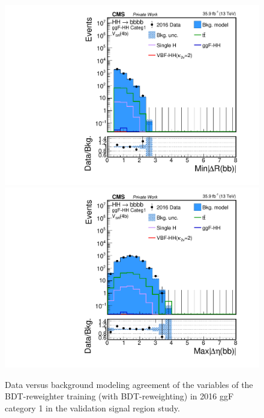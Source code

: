 \begin{figure}[htbp!]
\begin{center}
\includegraphics[width=0.24\linewidth]{Figures/Modeling/background/plotsDatadrivenWithBDT/2016/GGFcateg1_SR_210/Histogram/plot2016_min_4b_deltaR_Btag4_GGFcateg1_SR_210_Histogram_log.pdf}
\includegraphics[width=0.24\linewidth]{Figures/Modeling/background/plotsDatadrivenWithBDT/2016/GGFcateg1_SR_210/Histogram/plot2016_max_4b_deltaEta_Btag4_GGFcateg1_SR_210_Histogram_log.pdf}
\end{center}
\caption{Data versus background modeling agreement of the variables of the BDT-reweighter training (with BDT-reweighting) in 2016 ggF category 1 in the validation signal region study.}
\label{bkg:fig:valsrbdtregvarggf1_2016}
\end{figure}

